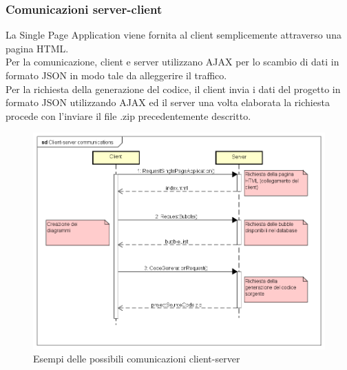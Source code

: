 \documentclass[../PianoDiQualifica.tex]{subfiles}
\begin{document}
			\subsubsection{Comunicazioni server-client}
				La Single Page Application viene fornita al client semplicemente attraverso una
				pagina HTML.\\
				Per la comunicazione, client e server utilizzano AJAX per lo
				scambio di dati in formato JSON in modo tale da alleggerire il traffico.\\
				Per la richiesta della generazione del codice, il client invia i dati del progetto
				in formato JSON utilizzando AJAX ed il server una volta elaborata la richiesta procede
				con l'inviare il file .zip precedentemente descritto.
				\begin{figure}[H] \label{fig:ClientServerCommunications}
					\centering
					\includegraphics[scale=0.4]{Immagini/ClientServerCommunications.png}
					\caption{Esempi delle possibili comunicazioni client-server}
				\end{figure}
\end{document}
